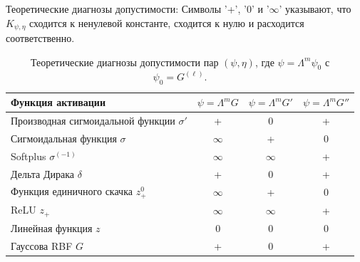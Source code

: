 \documentclass[12pt]{article}
\begin{document}
Теоретические диагнозы допустимости: Символы '+', '0' и '\( \infty \)' указывают, что \( K_{\psi, \eta} \) сходится к ненулевой константе, сходится к нулю и расходится соответственно.
\begin{table}[h]
	\centering
	\caption{Теоретические диагнозы допустимости пар \( (\psi, \eta) \), где \( \psi = \Lambda^m \psi_0 \) с \( \psi_0 = G^{(\ell)} \).}
	\label{tab:admissibility_diagnosis}
	\begin{tabular}{lccc}
		\toprule
		\textbf{Функция активации} & \( \psi = \Lambda^m G \) & \( \psi = \Lambda^m G' \) & \( \psi = \Lambda^m G'' \) \\
		\midrule
		Производная сигмоидальной функции \( \sigma' \) & + & 0 & + \\
		Сигмоидальная функция \( \sigma \) & \( \infty \) & + & 0 \\
		Softplus \( \sigma^{(-1)} \) & \( \infty \) & \( \infty \) & + \\
		Дельта Дирака \( \delta \) & + & 0 & + \\
		Функция единичного скачка \( z_+^0 \) & \( \infty \) & + & 0 \\
		ReLU \( z_+ \) & \( \infty \) & \( \infty \) & + \\
		Линейная функция \( z \) & 0 & 0 & 0 \\
		Гауссова RBF \( G \) & + & 0 & + \\
		\bottomrule
	\end{tabular}
\end{table}
\end{document}
